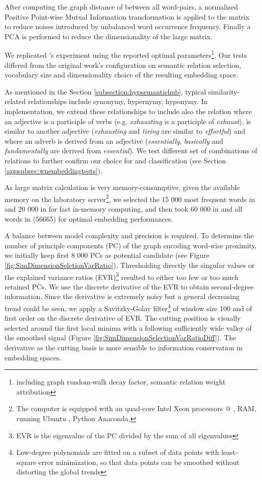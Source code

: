 After computing the graph distance of between all word-pairs, a normalized Positive Point-wise Mutual Information transformation is applied to the matrix to reduce noises introduced by unbalanced word occurrence frequency. Finally a PCA is performed to reduce the dimensionality of the large matrix. 

We replicated \citeauthor{saediWordNetEmbeddings2018}'s experiment using the reported optimal parameters\footnote{including graph random-walk decay factor, semantic relation weight attribution}. Our tests differed from the original work's configuration on semantic relation selection, vocabulary size and dimensionality choice of the resulting embedding space. 

As mentioned in the Section \ref{subsection:hypsemantichub}, typical similarity-related relationships include synonymy, hypernymy, hyponymy. In  implementation, we extend these relationships to include also the relation where an adjective is a participle of verbs (e.g. \emph{exhausting} is a participle of \emph{exhaust}), is similar to another adjective (\emph{exhausting} and \emph{tiring} are similar to \emph{effortful}) and where an adverb is derived from an adjective (\emph{essentially}, \emph{basically} and \emph{fundamentally} are derived from \emph{essential}). We test different set of combinations of relations to further confirm our choice for \similarity and \association classification (see Section \ref{appsubsec:wnembeddingtests}).

As large matrix calculation is very memory-consumptive, given the available memory on the laboratory server\footnote{The computer is equipped with an quad-core Intel Xeon processors @ ,  RAM, running Ubuntu , Python  Anaconda.}, we selected the 15 000 most frequent words in  and 20 000 in  for fast in-memory computing, and then took 60 000 in  and all words in  (56665) for optimal embedding performances. 

A balance between model complexity and precision is required. To determine the number of principle components (PC) of the graph encoding word-wise proximity, we initially keep first 8 000 PCs as potential candidate (see Figure \ref{fig:SimDimensionSeletionVarRatio}). Thresholding directly the singular values or the explained variance ratios (EVR)\footnote{EVR is the eigenvalue of the PC divided by the sum of all eigenvalues} resulted to either too few or too much retained PCs. We use the discrete derivative of the EVR to obtain second-degree information. Since the derivative is extremely noisy but a general decreasing trend could be seen, we apply a Savitzky-Golay filter\footnote{Low-degree polynomials are fitted on a subset of data points with least-square error minimization, so that data points can be smoothed without distorting the global trends} of window size 100 and of first order on the discrete derivative of EVR. The cutting position is visually selected around the first local minima with a following sufficiently wide valley of the smoothed signal (Figure \ref{fig:SimDimensionSelectionVarRatioDiff}). The derivative as the cutting basis is more sensible to information conservation in embedding spaces.

